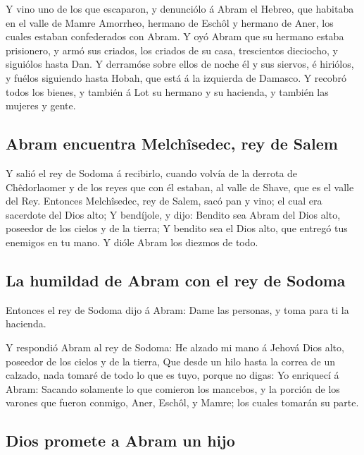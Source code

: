  Y vino uno de los que escaparon, y denunciólo á Abram el
Hebreo, que habitaba en el valle de Mamre Amorrheo, hermano de Eschôl y
hermano de Aner, los cuales estaban confederados con Abram.
 Y oyó Abram que su hermano estaba prisionero, y armó sus
criados, los criados de su casa, trescientos dieciocho, y siguiólos
hasta Dan.  Y derramóse sobre ellos de noche él y sus
siervos, é hiriólos, y fuélos siguiendo hasta Hobah, que está á la
izquierda de Damasco.  Y recobró todos los bienes, y
también á Lot su hermano y su hacienda, y también las mujeres y gente.

\hypertarget{abram-encuentra-melchuxeesedec-rey-de-salem}{%
\subsection{Abram encuentra Melchîsedec, rey de
Salem}\label{abram-encuentra-melchuxeesedec-rey-de-salem}}

 Y salió el rey de Sodoma á recibirlo, cuando volvía de la
derrota de Chêdorlaomer y de los reyes que con él estaban, al valle de
Shave, que es el valle del Rey.  Entonces Melchîsedec, rey
de Salem, sacó pan y vino; el cual era sacerdote del Dios alto;
 Y bendíjole, y dijo: Bendito sea Abram del Dios alto,
poseedor de los cielos y de la tierra;  Y bendito sea el
Dios alto, que entregó tus enemigos en tu mano. Y dióle Abram los
diezmos de todo.

\hypertarget{la-humildad-de-abram-con-el-rey-de-sodoma}{%
\subsection{La humildad de Abram con el rey de
Sodoma}\label{la-humildad-de-abram-con-el-rey-de-sodoma}}

 Entonces el rey de Sodoma dijo á Abram: Dame las personas,
y toma para ti la hacienda.

 Y respondió Abram al rey de Sodoma: He alzado mi mano á
Jehová Dios alto, poseedor de los cielos y de la tierra, 
Que desde un hilo hasta la correa de un calzado, nada tomaré de todo lo
que es tuyo, porque no digas: Yo enriquecí á Abram: 
Sacando solamente lo que comieron los mancebos, y la porción de los
varones que fueron conmigo, Aner, Eschôl, y Mamre; los cuales tomarán su
parte.

\hypertarget{dios-promete-a-abram-un-hijo}{%
\subsection{Dios promete a Abram un
hijo}\label{dios-promete-a-abram-un-hijo}}

